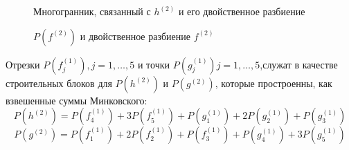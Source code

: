 \documentclass[russian]{lecture-notes}
\begin{document}
\newpage
	\begin{figure}[!ht]
		\caption{Многогранник, связанный с $h^{(2)}$ и его двойственное разбиение}
		
	\end{figure}
	\newpage
	\begin{figure}[!ht]
		\caption{$P(f^{(2)})$ и двойственное разбиение $f^{(2)}$}
	\end{figure}
	
	\newpage
	\newpage
	Отрезки $P(f_j^{(1)}), j =1,\dots,5$ и точки $P(g_j^{(1)})j =1,\dots,5$,служат в качестве строительных блоков для $P(h^{(2)})$ и $P(g^{(2)})$, которые простроенны, как взвешенные суммы Минковского:
	\[
		P(h^{(2)}) = P(f^{(1)}_4) +  3P(f^{(1)}_5) +  P(g^{(1)}_1) + 2P(g^{(1)}_2) + P(g^{(1)}_3)
	\]
	\[
		P(g^{(2)}) = P(f^{(1)}_1) +  2P(f^{(1)}_2) +  P(f^{(1)}_3) + P(g^{(1)}_4) + 3P(g^{(1)}_5)
	\]
	
	
	
\end{document}
